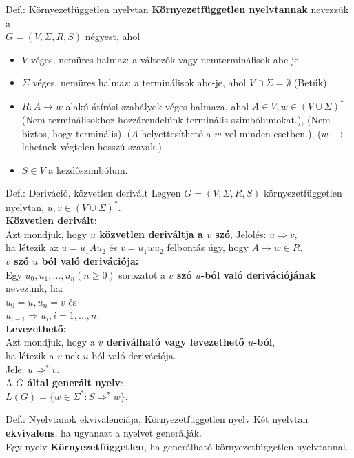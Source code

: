 \documentclass{beamer}
\begin{document}
\begin{frame}
\begin{block}{Def.: Környezetfüggetlen nyelvtan}
\textbf{Környezetfüggetlen nyelvtannak} nevezzük a\\
$G = (V, {\Sigma}, R, S)$ négyest, ahol\\
\begin{itemize}
\item $V$ véges, nemüres halmaz: a változók vagy nemterminálisok abc-je
\item $\Sigma$ véges, nemüres halmaz: a terminálisok abc-je, ahol $V \cap \Sigma = \emptyset$ (Betűk)
\item $R : A \rightarrow w$ alakú átírási szabályok véges halmaza, ahol $A \in V, w \in (V \cup {\Sigma})^*$\\
(Nem terminálisokhoz hozzárendelünk terminális szimbólumokat.), (Nem biztos, hogy terminális), ($A$ helyettesíthető a $w$-vel minden esetben.), ($w$ $\rightarrow$ lehetnek végtelen hosszú szavak.)
\item $S \in V$ a kezdőszimbólum.
\end{itemize}
\end{block}

\begin{block}{Def.: Deriváció, közvetlen derivált}
Legyen $G = (V, {\Sigma}, R, S)$ környezetfüggetlen nyelvtan, $u, v \in (V \cup {\Sigma})^*$.\\
\medskip
\textbf{Közvetlen derivált:}\\
Azt mondjuk, hogy \textbf{$u$ közvetlen deriváltja a $v$ szó}, Jelölés: $u \Rightarrow v$,\\
ha létezik az $u = u_1Au_2$ és $v = u_1wu_2$ felbontás úgy, hogy $A  \rightarrow w \in R$.\\
\medskip
\textbf{$v$ szó $u$ ból való derivációja:}\\
Egy $u_0, u_1, ..., u_n (n \geq 0)$ sorozatot a \textbf{$v$ szó $u$-ból való derivációjának} nevezünk, ha:\\
$u_0 = u, u_n = v$ és\\
$u_{i - 1} \Rightarrow u_i, i = 1, ..., n$.\\
\medskip
\textbf{Levezethető:}\\
Azt mondjuk, hogy a \textbf{$v$ deriválható vagy levezethető $u$-ból},
\\ha létezik a $v$-nek $u$-ból való derivációja.\\
Jele: $u {\Rightarrow}^* v$.\\
\medskip
A \textbf{$G$ által generált nyelv}:\\
$L(G) = \{w \in {\Sigma}^* : S {\Rightarrow}^* w\}$.

\end{block}

\begin{block}{Def.: Nyelvtanok ekvivalenciája, Környezetfüggetlen nyelv}
Két nyelvtan \textbf{ekvivalens}, ha ugyanazt a nyelvet generálják.\\
Egy nyelv \textbf{Környezetfüggetlen}, ha generálható környezetfüggetlen nyelvtannal.
\end{block}

\end{frame}
\end{document}
